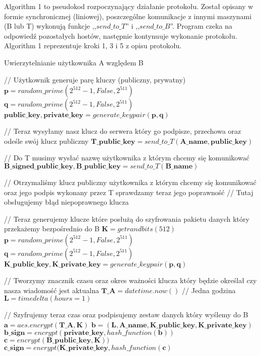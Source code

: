\documentclass[11pt]{article}
\begin{document}
Algorithm 1 to pseudokod rozpoczynający działanie protokołu. Został opisany w formie synchronicznej (liniowej), poszczególne komunikacje z innymi maszynami (B lub T) wykonują funkcje ,,$send\_to\_T$'' i ,,$send\_to\_B$''. Program czeka na odpowiedź pozostałych hostów, następnie kontynuuje wykonanie protokołu.\\
Algorithm 1 reprezentuje kroki 1, 3 i 5 z opisu protokołu.

\begin{algorithm}
	\caption{Uwierzytelnianie użytkownika A względem B}
	\begin{algorithmic}[1]
	    \State // Użytkownik generuje parę kluczy (publiczny, prywatny)
	    \State $\mathbf{p} = {random\_prime}(2^{512}-1,{False},2^{511})$
	    \State $\mathbf{q} = {random\_prime}(2^{512}-1,{False},2^{511})$
	    \State $\mathbf{public\_key, private\_key} = {generate\_keypair}(\mathbf{p}, \mathbf{q})$
	    
	    \State // Teraz wysyłamy nasz klucz do serwera który go podpisze, przechowa oraz odeśle swój klucz publiczny
	    \State $\mathbf{T\_public\_key} = send\_to\_T(\mathbf{A\_name}, \mathbf{public\_key})$
	    
	    \State // Do T musimy wysłać nazwę użytkownika z którym chcemy się komunikować
	    \State $\mathbf{B\_signed\_public\_key, B\_public\_key} = send\_to\_T(\mathbf{B\_name})$
	    
	    \State // Otrzymaliśmy klucz publiczny użytkownika z którym chcemy się komunikować oraz jego podpis wykonany przez T sprawdzamy teraz jego poprawność
	        \State // Tutaj obsługujemy błąd niepoprawnego klucza
	    \EndIf
	    
        \State // Teraz generujemy klucze które posłużą do szyfrowania pakietu danych który przekażemy bezpośrednio do B
        \State $\mathbf{K} = getrandbits(512)$
        \State $\mathbf{p} = {random\_prime}(2^{512}-1,{False},2^{511})$
	    \State $\mathbf{q} = {random\_prime}(2^{512}-1,{False},2^{511})$
	    \State $\mathbf{K\_public\_key, K\_private\_key} = {generate\_keypair}(\mathbf{p}, \mathbf{q})$
	    
	    \State // Tworzymy znacznik czasu oraz okres ważności klucza który będzie określał czy nasza wiadomość jest aktualna 
	    \State $\mathbf{T\_A} = datetime.now()$
	    \State // Jedna godzina
        \State $\mathbf{L} = timedelta(hours=1)$

        \State // Szyfrujemy teraz czas oraz podpisujemy zestaw danych który wyślemy do B
        \State $\mathbf{a} = aes.encrypt(\mathbf{T\_A}, \mathbf{K})$
        \State $\mathbf{b} = (\mathbf{L}, \mathbf{A\_name}, \mathbf{K\_public\_key}, \mathbf{K\_private\_key})$
        \State $\mathbf{b\_sign} = encrypt(\mathbf{private\_key}, hash\_function(\mathbf{b}))$
	    \State $\mathbf{c} = encrypt(\mathbf{B\_public\_key}, \mathbf{K}))$
	    \State $\mathbf{c\_sign} = encrypt(\mathbf{K\_private\_key}, hash\_function(\mathbf{c})$
	    

\end{algorithmic}
\end{algorithm}
\end{document}
